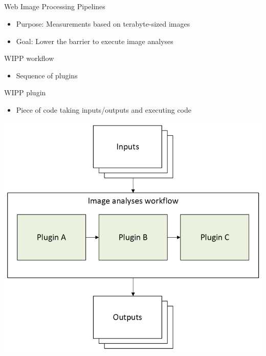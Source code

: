 \subsection{\slidetitle}
\begin{frame}
  \frametitle{\sectiontitle}
  \framesubtitle{\slidetitle}

  \begin{minipage}[h!]{0.40\textwidth}

    Web Image Processing Pipelines
    \begin{itemize}
      \item Purpose: Measurements based on terabyte-sized images
      \item Goal: Lower the barrier to execute image analyses
    \end{itemize}

    WIPP workflow
    \begin{itemize}
      \item Sequence of plugins
    \end{itemize}

    WIPP plugin
    \begin{itemize}
      \item Piece of code taking inputs/outputs and executing code
    \end{itemize}
  \end{minipage}\hfill
  \begin{minipage}[h!]{0.55\textwidth}
    \includegraphics[scale=0.55]{./img/1_background/plugins.png}
  \end{minipage}
\end{frame}

